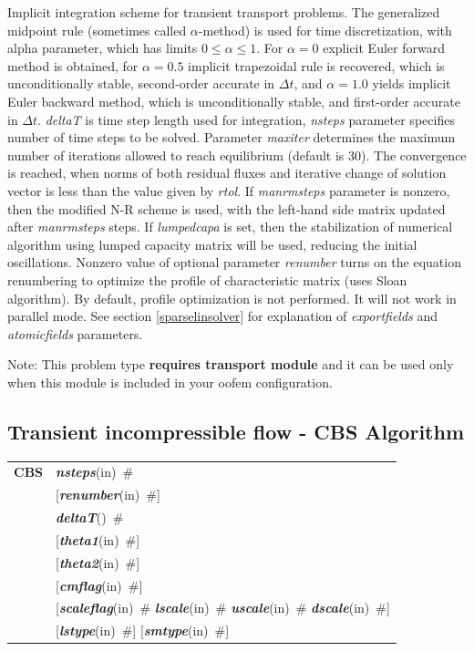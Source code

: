 \documentclass[a4paper]{article}
\makeatletter
\newcommand{\param}[1]{{\em #1}}
\newcommand{\keywordnotype}[1]{\mbox{{\it{\bf{#1}}}}}
\newcommand{\keyword}[2]{\mbox{{\keywordnotype{#1}\tiny (#2)}}}
\newcommand{\entKeywordInst}[1]{\mbox{{\bf{{#1}}}}}
\newcommand{\field}[2]{\mbox{\keyword{#1}{#2}~\#}}
\newcommand{\optField}[2]{\mbox{[\field{#1}{#2}]}}
\newenvironment{record}[1][]{\begin{tabular}{|ll}}{\end{tabular}\\}
\newcommand{\recentry}[2]{{#1}&{#2}\\}
\newcounter{rcc}
\newenvironment{record}[1][\textwidth]{\setcounter{rcc}{0}\begin{tabular*}{#1}{|ll@{\extracolsep{\fill}}r}}{\end{tabular*}\\}
\newcommand{\recentry}[2]{\ifthenelse{\value{rcc}>0}{&$\backslash$ \\}{\setcounter{rcc}{1}}{#1}&{#2}}
\makeatother
\begin{document}
Implicit
integration scheme for transient transport problems. The generalized
midpoint rule (sometimes called $\alpha$-method) is used for time discretization, with alpha parameter,
which has limits $0\le\alpha\le1$. For $\alpha=0$ explicit Euler
forward method is obtained, for $\alpha=0.5$ implicit trapezoidal rule
is recovered, which is unconditionally stable, second-order accurate
in $\Delta t$, and $\alpha=1.0$ yields implicit Euler backward method,
which is unconditionally stable, and first-order accurate
in $\Delta t$. \param{deltaT} is time step length used for
integration, \param{nsteps} parameter specifies
number of time steps to be solved. Parameter \param{maxiter} determines the maximum
number of iterations allowed to reach equilibrium (default is 30). 
The convergence is reached, when norms of both residual fluxes and iterative
change of solution vector is less than the value given by \param{rtol}.
If \param{manrmsteps} parameter is nonzero, then the modified
N-R scheme is used, with the left-hand side matrix updated after
\param{manrmsteps} steps.
If \param{lumpedcapa} is set, then the stabilization of numerical
algorithm using lumped capacity matrix will be used, reducing the
initial oscillations.
Nonzero value of optional parameter \param{renumber} turns on the
equation renumbering to optimize the profile of characteristic matrix
(uses Sloan algorithm). By default, profile optimization is not
performed. It will not work in parallel mode.
See section \ref{sparselinsolver} for explanation of
\param{exportfields} and \param{atomicfields} parameters.

Note: This problem type {\bf requires transport module} and it
can be used only when this module is included in your oofem
configuration.

\subsection{Transient incompressible flow - CBS Algorithm}
\label{cbsIncomp}
\begin{record}
\recentry{\entKeywordInst{CBS}}{\field{nsteps}{in}}
\recentry{}{\optField{renumber}{in}}
\recentry{}{\field{deltaT}{}} \recentry{}{\optField{theta1}{in}} \recentry{}{\optField{theta2}{in}}
\recentry{}{\optField{cmflag}{in}} 
\recentry{}{[\field{scaleflag}{in} \field{lscale}{in} \field{uscale}{in} \field{dscale}{in}]}
\recentry{}{\optField{lstype}{in} \optField{smtype}{in}}
\end{record}
\end{document}
